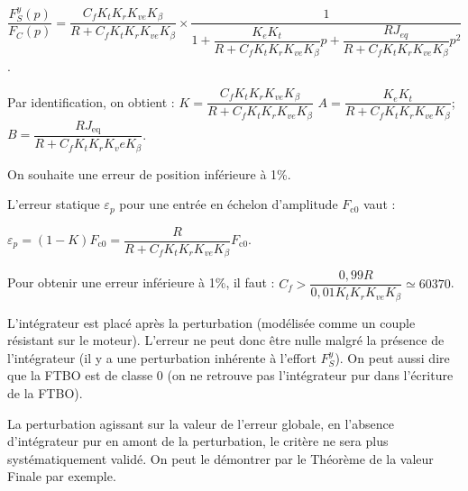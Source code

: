 \ifprof
\begin{corrige}

$\dfrac{F_S^y (p)}{F_C (p)}=\dfrac{C_f K_t K_r K_{ve} K_{\beta}}{R+C_f K_t K_r K_{ve} K_{\beta} } \times \dfrac{1}{1+\dfrac{K_e K_t}{R+C_f K_t K_r K_{ve} K_{\beta} }p+\dfrac{RJ_{eq}}{R+C_f K_t K_r K_{ve} K_{\beta} } p^2}$.


Par identification, on obtient :
$K=\dfrac{C_f K_t K_r K_{ve} K_{\beta}}{R+C_f K_t K_r K_{ve} K_{\beta}}$
$A=\dfrac{K_e K_t}{R+C_f K_t K_r K_{ve} K_{\beta} }$;
$B=\dfrac{RJ_{\text{eq}}}{R+C_f K_t K_r K_ve K_{\beta} }$.

\end{corrige}
\else
\fi

On souhaite une erreur de position inférieure à 1\%.

\ifprof
\begin{corrige}
L’erreur statique $\varepsilon_p$ pour une entrée en échelon d’amplitude $F_{\text{c0}}$ vaut :

$\varepsilon_p=(1-K) F_{\text{c0}}=\dfrac{R}{R+C_f K_t K_r K_{ve} K_{\beta} } F_{\text{c0}}$.

Pour obtenir une erreur inférieure à 1\%, il faut :
$C_f>\dfrac{0,99R}{0,01K_t K_r K_{ve} K_{\beta} } \simeq 60370$.

\end{corrige}
\else
\fi

\ifprof
\begin{corrige}
L’intégrateur est placé  après la perturbation (modélisée comme un couple résistant sur le moteur). L’erreur ne peut donc être nulle malgré la présence de l’intégrateur (il y a une perturbation inhérente à l’effort $F_S^y$).
On peut aussi dire que la FTBO est de classe 0 (on ne retrouve pas l’intégrateur pur dans l’écriture de la FTBO).

\end{corrige}
\else
\fi

\ifprof
\begin{corrige}
La perturbation agissant sur la valeur de l’erreur globale, en l’absence d’intégrateur pur en amont de la perturbation, le critère ne sera plus systématiquement validé. On peut le démontrer par le Théorème de la valeur Finale par exemple.
\end{corrige}
\else
\fi

